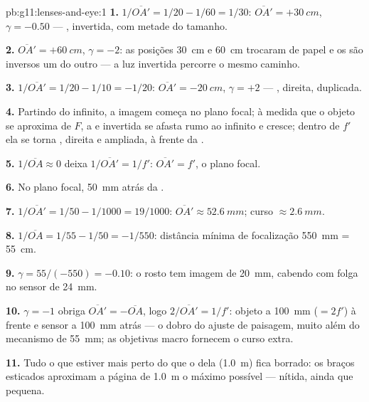 \begin{solution}{pb:g11:lenses-and-eye:1}
\textbf{1.} $1/\overline{OA'} = 1/20 - 1/60 = 1/30$:
$\overline{OA'} = +\qty{30}{cm}$, $\gamma = -0.50$ --- , invertida,
com metade do tamanho.

\textbf{2.} $\overline{OA'} = +\qty{60}{cm}$, $\gamma = -2$: as posições
\qty{30}{cm} e \qty{60}{cm} trocaram de papel e os  são inversos
um do outro --- a luz invertida percorre o mesmo caminho.

\textbf{3.} $1/\overline{OA'} = 1/20 - 1/10 = -1/20$:
$\overline{OA'} = \qty{-20}{cm}$, $\gamma = +2$ --- , direita,
duplicada.

\textbf{4.} Partindo do infinito, a imagem começa no plano focal; à
medida que o objeto se aproxima de $F$, a  e invertida se
afasta rumo ao infinito e cresce; dentro de $f'$ ela se torna ,
direita e ampliada, à frente da .

\textbf{5.} $1/\overline{OA} \approx 0$ deixa
$1/\overline{OA'} = 1/f'$: $\overline{OA'} = f'$, o plano focal.

\textbf{6.} No plano focal, \qty{50}{mm} atrás da .

\textbf{7.} $1/\overline{OA'} = 1/50 - 1/1000 = 19/1000$:
$\overline{OA'} \approx \qty{52.6}{mm}$; curso
$\approx \qty{2.6}{mm}$.

\textbf{8.} $1/\overline{OA} = 1/55 - 1/50 = -1/550$: distância mínima de
focalização \qty{550}{mm} = \qty{55}{cm}.

\textbf{9.} $\gamma = 55/(-550) = -0.10$: o rosto tem imagem de
\qty{20}{mm}, cabendo com folga no sensor de \qty{24}{mm}.

\textbf{10.} $\gamma = -1$ obriga
$\overline{OA'} = -\overline{OA}$, logo $2/\overline{OA'} = 1/f'$:
objeto a \qty{100}{mm} ($= 2f'$) à frente e sensor a \qty{100}{mm} atrás
--- o dobro do ajuste de paisagem, muito além do mecanismo de
\qty{55}{mm}; as objetivas macro fornecem o curso extra.

\textbf{11.} Tudo o que estiver mais perto do que o  dela
(\qty{1.0}{m}) fica borrado: os braços esticados aproximam a página de
\qty{1.0}{m} o máximo possível --- nítida, ainda que pequena.


\end{solution}
